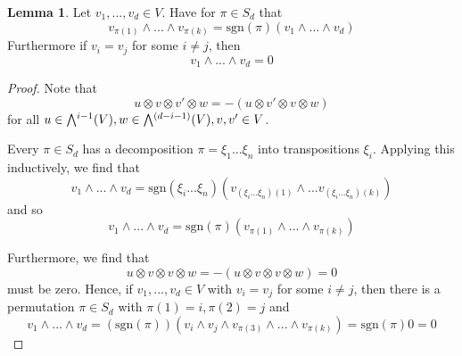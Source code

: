 \documentclass{scrartcl}
\newcommand{\sgn}{\mathrm{sgn}}
\newcommand{\extpow}{\mathchoice{{\textstyle\bigwedge}}
    {{\bigwedge}}
    {{\textstyle\wedge}}
    {{\scriptstyle\wedge}}}
\theoremstyle{definition}
\newtheorem{lemma}[definition]{Lemma}
\begin{document}
\begin{lemma}
    \label{prop:basic_properties_exterior_product}
    Let $v_1, ..., v_d \in V$. Have for $\pi \in S_d$ that
    \begin{equation*}
        v_{\pi(1)} \wedge ... \wedge v_{\pi(k)} = \sgn(\pi) (v_1 \wedge ... \wedge v_d)
    \end{equation*}
    Furthermore if $v_i = v_j$ for some $i \neq j$, then
    \begin{equation*}
        v_1 \wedge ... \wedge v_d = 0
    \end{equation*}
\end{lemma}
\begin{proof}
    Note that
    \begin{equation*}
        u \otimes v \otimes v' \otimes w = -(u \otimes v' \otimes v \otimes w)
    \end{equation*}
    for all $u \in \extpow^{i - 1}(V), w \in \extpow^{(d - i - 1)}(V), v, v' \in V$.

    Every $\pi \in S_d$ has a decomposition $\pi = \xi_1 ... \xi_n$ into transpositions $\xi_i$.
    Applying this inductively, we find that
    \begin{equation*}
        v_1 \wedge ... \wedge v_d = \sgn(\xi_i ... \xi_n) (v_{(\xi_i ... \xi_n)(1)} \wedge ... v_{(\xi_i ... \xi_n)(k)})
    \end{equation*}
    and so
    \begin{equation*}
        v_1 \wedge ... \wedge v_d = \sgn(\pi) (v_{\pi(1)} \wedge ... \wedge v_{\pi(k)})
    \end{equation*}

    Furthermore, we find that
    \begin{equation*}
        u \otimes v \otimes v \otimes w = -(u \otimes v \otimes v \otimes w) = 0
    \end{equation*}
    must be zero.
    Hence, if $v_1, ..., v_d \in V$ with $v_i = v_j$ for some $i \neq j$, then there is a permutation $\pi \in S_d$ with $\pi(1) = i, \pi(2) = j$ and
    \begin{equation*}
        v_1 \wedge ... \wedge v_d = (\sgn(\pi))(v_i \wedge v_j \wedge v_{\pi(3)} \wedge ... \wedge v_{\pi(k)}) = \sgn(\pi) 0 = 0
    \end{equation*}
\end{proof}
\end{document}
